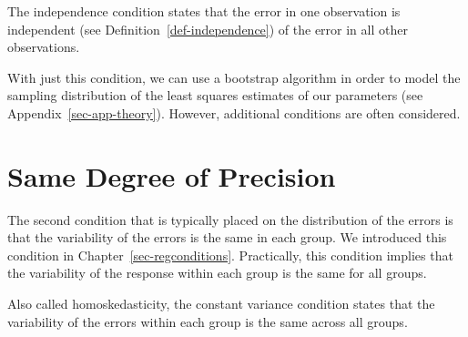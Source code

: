 \documentclass[
  letterpaper,
  DIV=11,
  numbers=noendperiod]{scrreprt}
\theoremstyle{definition}
\theoremstyle{definition}
\theoremstyle{plain}
\theoremstyle{remark}
\begin{document}
\begin{tcolorbox}[enhanced jigsaw, colbacktitle=quarto-callout-note-color!10!white, colback=white, left=2mm, title=\textcolor{quarto-callout-note-color}{\faInfo}\hspace{0.5em}{Independence Condition}, toptitle=1mm, leftrule=.75mm, breakable, bottomrule=.15mm, arc=.35mm, rightrule=.15mm, toprule=.15mm, coltitle=black, opacityback=0, colframe=quarto-callout-note-color-frame, opacitybacktitle=0.6, bottomtitle=1mm, titlerule=0mm]

The independence condition states that the error in one observation is
independent (see Definition~\ref{def-independence}) of the error in all
other observations.

\end{tcolorbox}

With just this condition, we can use a bootstrap algorithm in order to
model the sampling distribution of the least squares estimates of our
parameters (see Appendix~\ref{sec-app-theory}). However, additional
conditions are often considered.

\section{Same Degree of Precision}\label{same-degree-of-precision-1}

The second condition that is typically placed on the distribution of the
errors is that the variability of the errors is the same in each group.
We introduced this condition in Chapter~\ref{sec-regconditions}.
Practically, this condition implies that the variability of the response
within each group is the same for all groups.

\begin{tcolorbox}[enhanced jigsaw, colbacktitle=quarto-callout-note-color!10!white, colback=white, left=2mm, title=\textcolor{quarto-callout-note-color}{\faInfo}\hspace{0.5em}{Constant Variance}, toptitle=1mm, leftrule=.75mm, breakable, bottomrule=.15mm, arc=.35mm, rightrule=.15mm, toprule=.15mm, coltitle=black, opacityback=0, colframe=quarto-callout-note-color-frame, opacitybacktitle=0.6, bottomtitle=1mm, titlerule=0mm]

Also called homoskedasticity, the constant variance condition states
that the variability of the errors within each group is the same across
all groups.

\end{tcolorbox}
\end{document}
